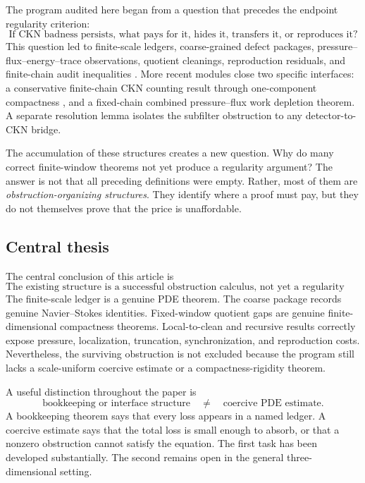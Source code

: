 \documentclass[11pt]{article}
\numberwithin{equation}{section}
\theoremstyle{remark}
\begin{document}
The program audited here began from a question that precedes the endpoint regularity criterion:
\begin{equation}\label{eq:guiding-question}
\boxed{
\text{If CKN badness persists, what pays for it, hides it, transfers it, or reproduces it?}
}
\end{equation}
This question led to finite-scale ledgers, coarse-grained defect packages, pressure--flux--energy--trace observations, quotient cleanings, reproduction residuals, and finite-chain audit inequalities \cite{YuIDC2026,YuLedger2026,YuAudit2026,YuComp2026,YuLocalClean2026,YuRecursive2026}. More recent modules close two specific interfaces: a conservative finite-chain CKN counting result through one-component compactness \cite{YuCKNCount2026}, and a fixed-chain combined pressure--flux work depletion theorem. A separate resolution lemma isolates the subfilter obstruction to any detector-to-CKN bridge.

The accumulation of these structures creates a new question. Why do many correct finite-window theorems not yet produce a regularity argument? The answer is not that all preceding definitions were empty. Rather, most of them are \emph{obstruction-organizing structures}. They identify where a proof must pay, but they do not themselves prove that the price is unaffordable.

\subsection{Central thesis}

The central conclusion of this article is
\begin{equation}\label{eq:central-thesis}
\boxed{
\text{The existing structure is a successful obstruction calculus, not yet a regularity mechanism.}
}
\end{equation}
The finite-scale ledger is a genuine PDE theorem. The coarse package records genuine Navier--Stokes identities. Fixed-window quotient gaps are genuine finite-dimensional compactness theorems. Local-to-clean and recursive results correctly expose pressure, localization, truncation, synchronization, and reproduction costs. Nevertheless, the surviving obstruction is not excluded because the program still lacks a scale-uniform coercive estimate or a compactness-rigidity theorem.

A useful distinction throughout the paper is
\begin{equation}\label{eq:bookkeeping-coercivity}
\text{bookkeeping or interface structure}
\quad\neq\quad
\text{coercive PDE estimate}.
\end{equation}
A bookkeeping theorem says that every loss appears in a named ledger. A coercive estimate says that the total loss is small enough to absorb, or that a nonzero obstruction cannot satisfy the equation. The first task has been developed substantially. The second remains open in the general three-dimensional setting.
\end{document}
